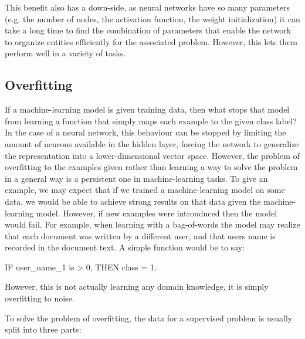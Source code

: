 This benefit also has a down-side, as neural networks have so many parameters (e.g. the number of nodes, the activation function, the weight initialization) it can take a long time to find the combination of parameters that enable the network to organize entities efficiently for the associated problem. However, this lets them perform well in a variety of tasks. 


\subsection{Overfitting}


If a machine-learning model is given training data, then what stops that model from learning a function that simply maps each example to the given class label? In the case of a neural network,  this behaviour can be stopped by limiting the amount of neurons available in the hidden layer, forcing the network to generalize the representation into a lower-dimensional vector space. However, the problem of overfitting to the examples given rather than learning a way to solve the problem in a general way is a persistent one in machine-learning tasks. To give an example, we may expect that if we trained a machine-learning model on some data, we would be able to achieve strong results on that data given the machine-learning model. However, if new examples were introuduced then the model would fail. For example, when learning with a bag-of-words the model may realize that each document was written by a different user, and that users name is recorded in the document text. A simple function would be to say:


IF user\_name\_1 is > 0, THEN class = 1.

However, this is not actually learning any domain knowledge, it is simply overfitting to noise.


To solve the problem of overfitting, the data for a supervised problem is usually split into three parts:

